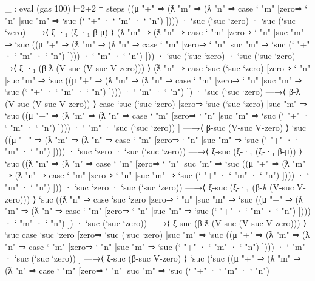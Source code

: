 \begin{fence}
\begin{code}
_ : eval (gas 100) ⊢2+2 ≡
  steps
   ((μ "+" ⇒
     (ƛ "m" ⇒
      (ƛ "n" ⇒
       case ` "m" [zero⇒ ` "n" |suc "m" ⇒ `suc (` "+" · ` "m" · ` "n")
       ])))
    · `suc (`suc `zero)
    · `suc (`suc `zero)
   —→⟨ ξ-·₁ (ξ-·₁ β-μ) ⟩
    (ƛ "m" ⇒
     (ƛ "n" ⇒
      case ` "m" [zero⇒ ` "n" |suc "m" ⇒
      `suc
      ((μ "+" ⇒
        (ƛ "m" ⇒
         (ƛ "n" ⇒
          case ` "m" [zero⇒ ` "n" |suc "m" ⇒ `suc (` "+" · ` "m" · ` "n")
          ])))
       · ` "m"
       · ` "n")
      ]))
    · `suc (`suc `zero)
    · `suc (`suc `zero)
   —→⟨ ξ-·₁ (β-ƛ (V-suc (V-suc V-zero))) ⟩
    (ƛ "n" ⇒
     case `suc (`suc `zero) [zero⇒ ` "n" |suc "m" ⇒
     `suc
     ((μ "+" ⇒
       (ƛ "m" ⇒
        (ƛ "n" ⇒
         case ` "m" [zero⇒ ` "n" |suc "m" ⇒ `suc (` "+" · ` "m" · ` "n")
         ])))
      · ` "m"
      · ` "n")
     ])
    · `suc (`suc `zero)
   —→⟨ β-ƛ (V-suc (V-suc V-zero)) ⟩
    case `suc (`suc `zero) [zero⇒ `suc (`suc `zero) |suc "m" ⇒
    `suc
    ((μ "+" ⇒
      (ƛ "m" ⇒
       (ƛ "n" ⇒
        case ` "m" [zero⇒ ` "n" |suc "m" ⇒ `suc (` "+" · ` "m" · ` "n")
        ])))
     · ` "m"
     · `suc (`suc `zero))
    ]
   —→⟨ β-suc (V-suc V-zero) ⟩
    `suc
    ((μ "+" ⇒
      (ƛ "m" ⇒
       (ƛ "n" ⇒
        case ` "m" [zero⇒ ` "n" |suc "m" ⇒ `suc (` "+" · ` "m" · ` "n")
        ])))
     · `suc `zero
     · `suc (`suc `zero))
   —→⟨ ξ-suc (ξ-·₁ (ξ-·₁ β-μ)) ⟩
    `suc
    ((ƛ "m" ⇒
      (ƛ "n" ⇒
       case ` "m" [zero⇒ ` "n" |suc "m" ⇒
       `suc
       ((μ "+" ⇒
         (ƛ "m" ⇒
          (ƛ "n" ⇒
           case ` "m" [zero⇒ ` "n" |suc "m" ⇒ `suc (` "+" · ` "m" · ` "n")
           ])))
        · ` "m"
        · ` "n")
       ]))
     · `suc `zero
     · `suc (`suc `zero))
   —→⟨ ξ-suc (ξ-·₁ (β-ƛ (V-suc V-zero))) ⟩
    `suc
    ((ƛ "n" ⇒
      case `suc `zero [zero⇒ ` "n" |suc "m" ⇒
      `suc
      ((μ "+" ⇒
        (ƛ "m" ⇒
         (ƛ "n" ⇒
          case ` "m" [zero⇒ ` "n" |suc "m" ⇒ `suc (` "+" · ` "m" · ` "n")
          ])))
       · ` "m"
       · ` "n")
      ])
     · `suc (`suc `zero))
   —→⟨ ξ-suc (β-ƛ (V-suc (V-suc V-zero))) ⟩
    `suc
    case `suc `zero [zero⇒ `suc (`suc `zero) |suc "m" ⇒
    `suc
    ((μ "+" ⇒
      (ƛ "m" ⇒
       (ƛ "n" ⇒
        case ` "m" [zero⇒ ` "n" |suc "m" ⇒ `suc (` "+" · ` "m" · ` "n")
        ])))
     · ` "m"
     · `suc (`suc `zero))
    ]
   —→⟨ ξ-suc (β-suc V-zero) ⟩
    `suc
    (`suc
     ((μ "+" ⇒
       (ƛ "m" ⇒
        (ƛ "n" ⇒
         case ` "m" [zero⇒ ` "n" |suc "m" ⇒ `suc (` "+" · ` "m" · ` "n")

\end{code}
\end{fence}
